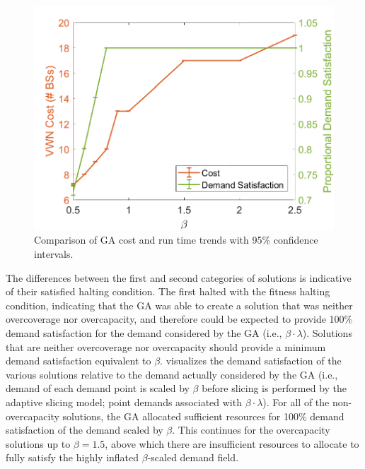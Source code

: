 \documentclass[12pt,dvipsnames]{report}
\begin{document}
\begin{figure}[htp]
	\centering
	\includegraphics[height=0.4\textheight]{Figures/CaseI_GAComparisonCostSat}
	\caption[Comparison of GA approach cost and demand satisfaction for Case I simulations]{Comparison of GA cost and run time trends with 95\% confidence intervals.}
	\label{fig:CaseI_GAComparisonCostSat}
\end{figure}

The differences between the first and second categories of solutions is indicative of their satisfied halting condition.  The first halted with the fitness halting condition, indicating that the GA was able to create a solution that was neither overcoverage nor overcapacity, and therefore could be expected to provide 100\% demand satisfaction for the demand considered by the GA (i.e., $\beta \cdot \lambda$).  Solutions that are neither overcoverage nor overcapacity should provide a minimum demand satisfaction equivalent to $\beta$.   visualizes the demand satisfaction of the various solutions relative to the demand actually considered by the GA (i.e., demand of each demand point is scaled by $\beta$ before slicing is performed by the adaptive slicing model; point demands associated with $\beta \cdot \lambda$).  For all of the non-overcapacity solutions, the GA allocated sufficient resources for 100\% demand satisfaction of the demand scaled by $\beta$.  This continues for the overcapacity solutions up to $\beta = 1.5$, above which there are insufficient resources to allocate to fully satisfy the highly inflated $\beta$-scaled demand field.
\end{document}
